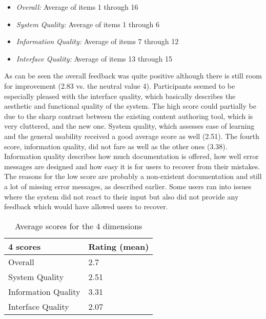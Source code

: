 \begin{itemize}
 \item \textit{Overall:} Average of items 1 through 16
 \item \textit{System Quality:} Average of items 1 through 6
 \item \textit{Information Quality:} Average of items 7 through 12
 \item \textit{Interface Quality:} Average of items 13 through 15
\end{itemize}

As can be seen the overall feedback was quite positive although there is still room for improvement (2.83 vs. the neutral value 4). Participants seemed to be especially pleased with the interface quality, which basically describes the aesthetic and functional quality of the system. The high score could partially be due to the sharp contrast between the existing content authoring tool, which is very cluttered, and the new one. System quality, which assesses ease of learning and the general usability received a good average score as well (2.51). The fourth score, information quality, did not fare as well as the other ones (3.38). Information quality describes how much documentation is offered, how well error messages are designed and how easy it is for users to recover from their mistakes. The reasons for the low score are probably a non-existent documentation and still a lot of missing error messages, as described earlier. Some users ran into issues where the system did not react to their input but also did not provide any feedback which would have allowed users to recover.

\begin{table}[h!]
\centering
\begin{tabular}{|l|l|}
\hline
\rowcolor[HTML]{EFEFEF}
{\bf 4 scores} & {\bf Rating (mean)} \\ \hline
Overall & 2.7 \\ \hline
System Quality & 2.51 \\ \hline
Information Quality & 3.31 \\ \hline
Interface Quality & 2.07 \\ \hline
\end{tabular}
\caption{Average scores for the 4 dimensions}
\label{table:post-study-scores}
\end{table}

